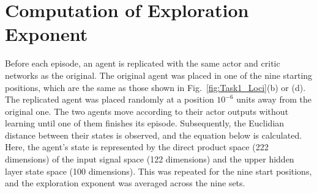 

\section{Computation of Exploration Exponent}\label{App:Expl_factor}
Before each episode, an agent is replicated with the same actor and critic networks as the original.
The original agent was placed in one of the nine starting positions, which are the same as those shown in Fig.~\ref{fig:Task1_Loci}(b) or (d).
The replicated agent was placed randomly at a position $10^{-6}$ units away from the original one.
The two agents move according to their actor outputs without learning until one of them finishes its episode.
Subsequently, the Euclidian distance between their states is observed, and the equation below is calculated.
Here, the agent's state is represented by the direct product space (222 dimensions)
of the input signal space (122 dimensions) and the upper hidden layer state space (100 dimensions).
This was repeated for the nine start positions, and the exploration exponent was averaged across the nine sets.

